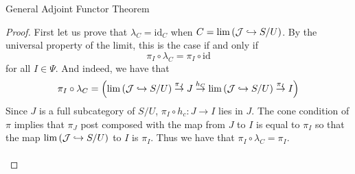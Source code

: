 \documentclass[a4paper]{article}
\begin{document}
\begin{thm}{General Adjoint Functor Theorem}{}
\begin{proof}
First let us prove that $\lambda_C=\text{id}_C$ when $C=\lim\left(\mathcal{J}\hookrightarrow S/U\right)$. By the universal property of the limit, this is the case if and only if $$\pi_I\circ\lambda_C=\pi_I\circ\text{id}$$ for all $I\in\Psi$. And indeed, we have that $$\pi_I\circ\lambda_C=\left(\lim\left(\mathcal{J}\hookrightarrow S/U\right)\overset{\pi_J}{\to}J\overset{h_C}{\to}\lim\left(\mathcal{J}\hookrightarrow S/U\right)\overset{\pi_I}{\to}I\right)$$ Since $J$ is a full subcategory of $S/U$, $\pi_I\circ h_c:J\to I$ lies in $J$. The cone condition of $\pi$ implies that $\pi_J$ post composed with the map from $J$ to $I$ is equal to $\pi_I$ so that the map $\lim\left(\mathcal{J}\hookrightarrow S/U\right)$ to $I$ is $\pi_I$. Thus we have that $\pi_I\circ\lambda_C=\pi_I$. \\~\\


\end{proof}
\end{thm}
\end{document}
